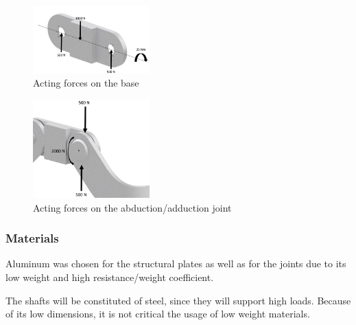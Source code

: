       \begin{figure}[thpb]
      \centering
      \includegraphics[width=0.4\textwidth]{Images/base_forcas.jpg}
      \caption{Acting forces on the base}
      \label{base forcas}
   \end{figure}
   
   \begin{figure}[b]
      \centering
      \includegraphics[width=0.4\textwidth]{Images/junta_quadril_1_forcas.jpg}
      \caption{Acting forces on the abduction/adduction joint}
      \label{junta quadril 1 forcas}
   \end{figure}
   

   
   \subsubsection{Materials}
   
   Aluminum was chosen for the structural plates as well as for the joints due to its low weight and high resistance/weight coefficient.
   
   The shafts will be constituted of steel, since they will support high loads. Because of its low dimensions, it is not critical the usage of low weight materials.
   
